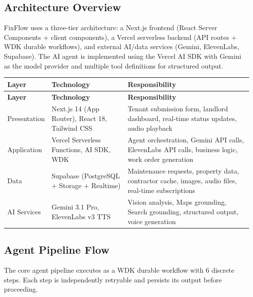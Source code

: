 \documentclass[12pt,a4paper]{article}
\begin{document}
\subsection{Architecture Overview}

FixFlow uses a three-tier architecture: a Next.js frontend (React Server Components + client components), a Vercel serverless backend (API routes + WDK durable workflows), and external AI/data services (Gemini, ElevenLabs, Supabase). The AI agent is implemented using the Vercel AI SDK with Gemini as the model provider and multiple tool definitions for structured output.

\begin{longtable}{L{2.5cm} L{4.5cm} L{6.5cm}}
\toprule
\textbf{Layer} & \textbf{Technology} & \textbf{Responsibility} \\
\midrule
\endfirsthead
\toprule
\textbf{Layer} & \textbf{Technology} & \textbf{Responsibility} \\
\midrule
\endhead
\bottomrule
\endfoot
Presentation & Next.js 14 (App Router), React 18, Tailwind CSS & Tenant submission form, landlord dashboard, real-time status updates, audio playback \\
\midrule
Application & Vercel Serverless Functions, AI SDK, WDK & Agent orchestration, Gemini API calls, ElevenLabs API calls, business logic, work order generation \\
\midrule
Data & Supabase (PostgreSQL + Storage + Realtime) & Maintenance requests, property data, contractor cache, images, audio files, real-time subscriptions \\
\midrule
AI Services & Gemini 3.1 Pro, ElevenLabs v3 TTS & Vision analysis, Maps grounding, Search grounding, structured output, voice generation \\
\end{longtable}

\subsection{Agent Pipeline Flow}

The core agent pipeline executes as a WDK durable workflow with 6 discrete steps. Each step is independently retryable and persists its output before proceeding.
\end{document}
